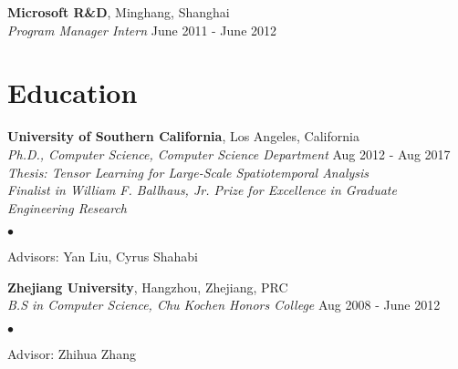 \documentclass[margin,line]{res}
\newenvironment{list1}{
  \begin{list}{\ding{113}}{%
      \setlength{\itemsep}{0in}
      \setlength{\parsep}{0in} \setlength{\parskip}{0in}
      \setlength{\topsep}{0in} \setlength{\partopsep}{0in} 
      \setlength{\leftmargin}{0.17in}}}{\end{list}}
\newenvironment{list2}{
  \begin{list}{$\bullet$}{%
      \setlength{\itemsep}{0in}
      \setlength{\parsep}{0in} \setlength{\parskip}{0in}
      \setlength{\topsep}{0in} \setlength{\partopsep}{0in} 
      \setlength{\leftmargin}{0.2in}}}{\end{list}}
\begin{document}
\begin{resume}
{\bf  Microsoft R\&D}, Minghang, Shanghai\\
\vspace{-.2cm}
{\em Program Manager Intern} \hfill {June  2011 - June  2012}

\section{\sc Education}
{\bf University of Southern California}, Los Angeles, California\\
{\em Ph.D., Computer Science, Computer Science Department} \hfill {Aug 2012 - Aug 2017}\\
{\em Thesis: Tensor Learning for Large-Scale Spatiotemporal Analysis} \\
{\em Finalist in William F. Ballhaus, Jr. Prize for Excellence in Graduate Engineering Research}
\begin{list2}
\vspace*{.05in}
\item Advisors:  Yan Liu, Cyrus Shahabi
\end{list2}



{\bf Zhejiang University}, Hangzhou, Zhejiang, PRC\\
{\em B.S in Computer Science, Chu Kochen Honors College} \hfill {Aug 2008 - June 2012}
\begin{list2}
\vspace*{.05in}
\item Advisor:  Zhihua Zhang
\end{list2}


\end{resume}
\end{document}

